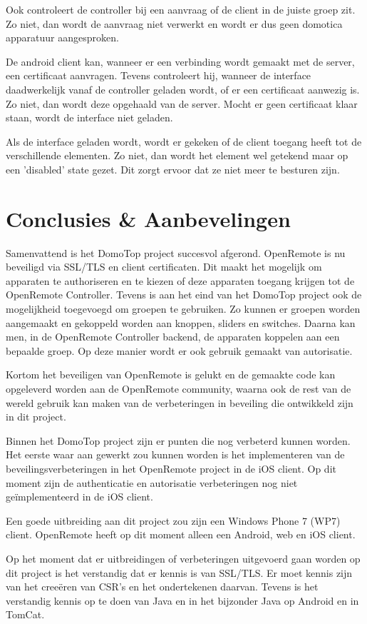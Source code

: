 \documentclass[]{article}
\begin{document}
Ook controleert de controller bij een aanvraag of de client in de juiste groep
zit. Zo niet, dan wordt de aanvraag niet verwerkt en wordt er dus geen domotica
apparatuur aangesproken. 

De android client kan, wanneer er een verbinding wordt gemaakt met de server,
een certificaat aanvragen. Tevens controleert hij, wanneer de interface
daadwerkelijk vanaf de controller geladen wordt, of er een certificaat aanwezig
is. Zo niet, dan wordt deze opgehaald van de server. Mocht er geen certificaat klaar
staan, wordt de interface niet geladen. 

Als de interface geladen wordt, wordt er gekeken of de client toegang heeft tot
de verschillende elementen. Zo niet, dan wordt het element wel getekend maar op
een 'disabled' state gezet. Dit zorgt ervoor dat ze niet meer te besturen zijn.


\newpage
\section{Conclusies \& Aanbevelingen}
Samenvattend is het DomoTop project succesvol afgerond. OpenRemote is nu beveiligd
via SSL/TLS en client certificaten. Dit maakt het mogelijk om apparaten te
authoriseren en te kiezen of deze apparaten toegang krijgen tot de
OpenRemote Controller. Tevens is aan het eind van het DomoTop project ook de
mogelijkheid toegevoegd om groepen te gebruiken. Zo kunnen er groepen worden aangemaakt en
gekoppeld worden aan knoppen, sliders en switches. Daarna kan men, in de OpenRemote
Controller backend, de apparaten koppelen aan een bepaalde groep. Op deze
manier wordt er ook gebruik gemaakt van autorisatie.

Kortom het beveiligen van OpenRemote is gelukt en de gemaakte code kan
opgeleverd worden aan de OpenRemote community, waarna ook de rest van de wereld
gebruik kan maken van de verbeteringen in beveiling die ontwikkeld zijn in dit
project. 

Binnen het DomoTop project zijn er punten die nog verbeterd kunnen worden. Het eerste waar
aan gewerkt zou kunnen worden is het implementeren van de beveilingsverbeteringen
in het OpenRemote project in de iOS client. Op dit moment zijn de
authenticatie en autorisatie verbeteringen nog niet ge\"implementeerd in de iOS
client.

Een goede uitbreiding aan dit project zou zijn een Windows Phone 7 (WP7) client.
OpenRemote heeft op dit moment alleen een Android, web en iOS client. 

Op het moment dat er uitbreidingen of verbeteringen uitgevoerd gaan worden op
dit project is het verstandig dat er kennis is van SSL/TLS. Er moet kennis zijn
van het cree\"eren van CSR's en het ondertekenen daarvan. Tevens is het
verstandig kennis op te doen van Java en in het bijzonder Java op Android en in
TomCat.
\end{document}
